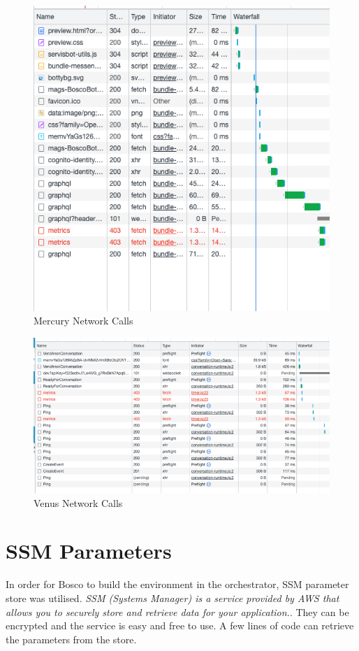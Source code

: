 \documentclass[12pt,a4paper,titlepage]{report}
\begin{document}
\begin{figure}[H]
 \centering
 \includegraphics[width=15cm]{./diagrams/mercury_network_calls.png}
 \caption{Mercury Network Calls}
\end{figure}

\begin{figure}[H]
 \centering
 \includegraphics[width=15cm]{./diagrams/venus_network_calls.png}
 \caption{Venus Network Calls}
\end{figure}



\section{SSM Parameters}
In order for Bosco to build the environment in the orchestrator, SSM parameter store was utilised. 
\textit{SSM (Systems Manager) is a service provided by AWS that allows you to securely store and retrieve data for your application.}\autocite{Halley}.
They can be encrypted and the service is easy and free to use. 
A few lines of code can retrieve the parameters from the store. 
\end{document}
